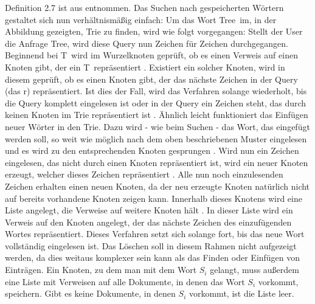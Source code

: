 Definition 2.7 ist aus \cite{Trie_wiki} entnommen.
\newline \newline
Das Suchen nach gespeicherten Wörtern gestaltet sich nun verhältnismäßig einfach: Um das Wort \glqq Tree\grqq\ im, in der Abbildung gezeigten, Trie zu finden, wird wie folgt vorgegangen:
\newline 
Stellt der User die Anfrage \glqq Tree\grqq, wird diese Query nun Zeichen für Zeichen durchgegangen. Beginnend bei \glqq T\grqq\ wird im Wurzelknoten geprüft, ob es einen Verweis auf einen Knoten gibt, der ein \glqq T\grqq\ repräsentiert \cite{trie_Abb}. Existiert ein solcher Knoten, wird in diesem geprüft, ob es einen Knoten gibt, der das nächste Zeichen in der Query (das \glqq r\grqq) repräsentiert. Ist dies der Fall, wird das Verfahren solange wiederholt, bis die Query komplett eingelesen ist oder in der Query ein Zeichen steht, das durch keinen Knoten im Trie repräsentiert ist \cite{trie_Abb} \cite{Trie_Blog}.
\newline \newline
Ähnlich leicht funktioniert das Einfügen neuer Wörter in den Trie. Dazu wird - wie beim Suchen - das Wort, das eingefügt werden soll, so weit wie möglich nach dem oben beschriebenen Muster eingelesen und es wird zu den entsprechenden Knoten gesprungen \cite{trie_Abb} \cite{Trie_Blog}. Wird nun ein Zeichen eingelesen, das nicht durch einen Knoten repräsentiert ist, wird ein neuer Knoten erzeugt, welcher dieses Zeichen repräsentiert \cite{trie_Abb}. Alle nun noch einzulesenden Zeichen erhalten einen neuen Knoten, da der neu erzeugte Knoten natürlich nicht auf bereits vorhandene Knoten zeigen kann. Innerhalb dieses Knotens wird eine Liste angelegt, die Verweise auf weitere Knoten hält \cite{trie_Abb}. In dieser Liste wird ein Verweis auf den Knoten angelegt, der das nächste Zeichen des einzufügenden Wortes repräsentiert. Dieses Verfahren setzt sich solange fort, bis das neue Wort vollständig eingelesen ist.
\newline \newline
Das Löschen soll in diesem Rahmen nicht aufgezeigt werden, da dies weitaus komplexer sein kann als das Finden oder Einfügen von Einträgen.
\newline \newline
Ein Knoten, zu dem man mit dem Wort $S_i$ gelangt, muss außerdem eine Liste mit Verweisen auf alle Dokumente, in denen das Wort $S_i$ vorkommt, speichern. Gibt es keine Dokumente, in denen $S_i$ vorkommt, ist die Liste leer.

